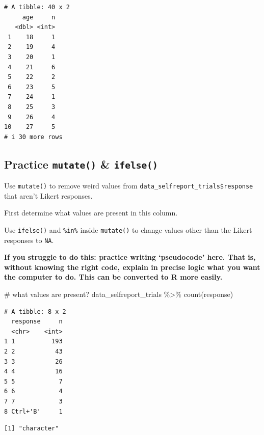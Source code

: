 \documentclass[
  letterpaper,
  DIV=11,
  numbers=noendperiod]{scrreprt}
\newenvironment{Shaded}{\begin{snugshade}}{\end{snugshade}}
\newcommand{\CommentTok}[1]{\textcolor[rgb]{0.37,0.37,0.37}{#1}}
\newcommand{\FunctionTok}[1]{\textcolor[rgb]{0.28,0.35,0.67}{#1}}
\newcommand{\NormalTok}[1]{\textcolor[rgb]{0.00,0.23,0.31}{#1}}
\newcommand{\SpecialCharTok}[1]{\textcolor[rgb]{0.37,0.37,0.37}{#1}}
\begin{document}
\begin{verbatim}
# A tibble: 40 x 2
     age     n
   <dbl> <int>
 1    18     1
 2    19     4
 3    20     1
 4    21     6
 5    22     2
 6    23     5
 7    24     1
 8    25     3
 9    26     4
10    27     5
# i 30 more rows
\end{verbatim}

\subsection{\texorpdfstring{Practice \texttt{mutate()} \&
\texttt{ifelse()}}{Practice mutate() \& ifelse()}}\label{practice-mutate-ifelse}

Use \texttt{mutate()} to remove weird values from
\texttt{data\_selfreport\_trials\$response} that aren't Likert
responses.

First determine what values are present in this column.

Use \texttt{ifelse()} and \texttt{\%in\%} inside \texttt{mutate()} to
change values other than the Likert responses to \texttt{NA}.

\textbf{If you struggle to do this: practice writing `pseudocode' here.
That is, without knowing the right code, explain in precise logic what
you want the computer to do. This can be converted to R more easily.}

\begin{Shaded}
\begin{Highlighting}[]
\CommentTok{\# what values are present?}
\NormalTok{data\_selfreport\_trials }\SpecialCharTok{\%\textgreater{}\%}
  \FunctionTok{count}\NormalTok{(response)}
\end{Highlighting}
\end{Shaded}

\begin{verbatim}
# A tibble: 8 x 2
  response     n
  <chr>    <int>
1 1          193
2 2           43
3 3           26
4 4           16
5 5            7
6 6            4
7 7            3
8 Ctrl+'B'     1
\end{verbatim}

\begin{Shaded}
\end{Shaded}

\begin{verbatim}
[1] "character"
\end{verbatim}
\end{document}
